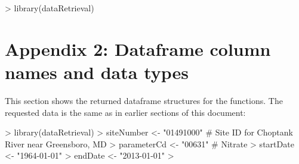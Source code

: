 \documentclass[a4paper,11pt]{article}
\begin{document}
\begin{Schunk}
\begin{Sinput}
> library(dataRetrieval)
\end{Sinput}
\end{Schunk}

\section{Appendix 2: Dataframe column names and data types}
This section shows the returned dataframe structures for the functions.  The requested data is the same as in earlier sections of this document:
\begin{Schunk}
\begin{Sinput}
> library(dataRetrieval)
> siteNumber <- "01491000" # Site ID for Choptank River near Greensboro, MD
> parameterCd <- "00631"  # Nitrate
> startDate <- "1964-01-01"
> endDate <- "2013-01-01"
> 
\end{Sinput}
\end{Schunk}

\end{document}
